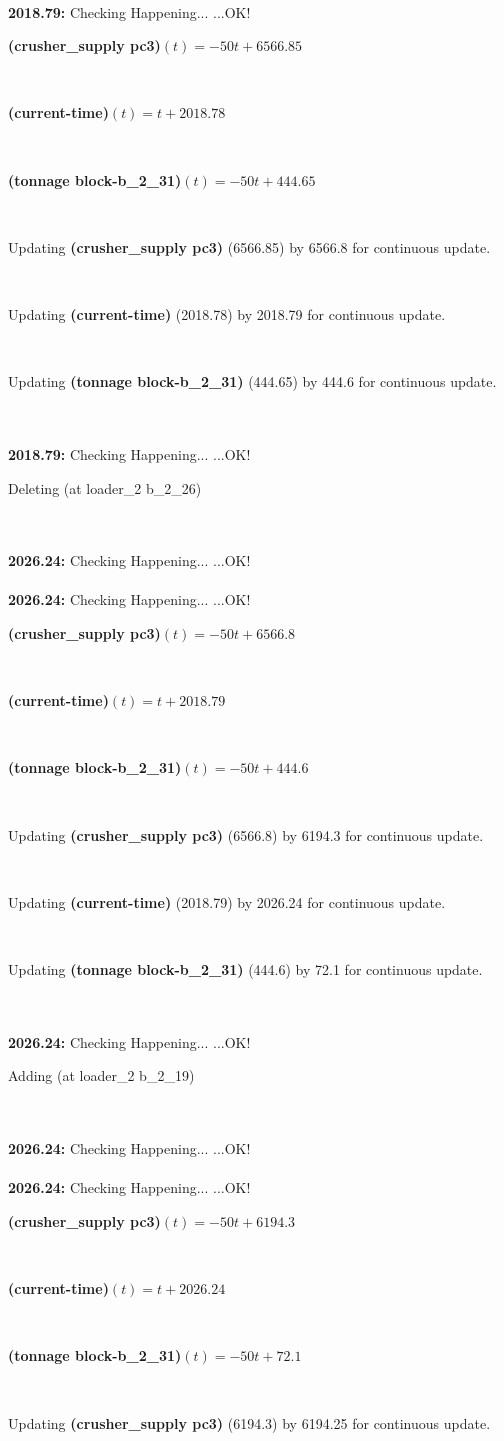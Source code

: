 \documentclass[a4paper,12pt]{article}
\newcommand{\atime}[1]{{\bf #1:}}
\newcommand{\exprn}[1]{{\sf #1}}
\newcommand{\fexprn}[1]{{\small {\bf #1}}}
\newcommand{\checkhappening}{Checking Happening... }
\newcommand{\listrow}[1]{\begin{minipage}[t]{11.5cm} #1 \end{minipage}}
\newcommand{\happeningOK}{...OK!}
\newcommand{\assignmentcts}[3]{\listrow{Updating \fexprn{#1} (#2) by #3 for continuous update.}}
\newcommand{\function}[2]{\listrow{\fexprn{#1}$(t) = #2$}}
\newcommand{\adding}[1]{\listrow{Adding \exprn{#1} }}
\newcommand{\deleting}[1]{\listrow{Deleting \exprn{#1} }}
\begin{document}
\begin{tabbing}
\\
\atime{2018.79} \> \checkhappening\happeningOK\\
 \> \function{(crusher\_supply pc3)}{ - 50t + 6566.85}\\
 \> \function{(current-time)}{t + 2018.78}\\
 \> \function{(tonnage block-b\_2\_31)}{ - 50t + 444.65}\\
 \> \assignmentcts{(crusher\_supply pc3)}{6566.85}{6566.8}\\
 \> \assignmentcts{(current-time)}{2018.78}{2018.79}\\
 \> \assignmentcts{(tonnage block-b\_2\_31)}{444.65}{444.6}\\
\\
\atime{2018.79} \> \checkhappening\happeningOK\\
 \> \deleting{(at loader\_2 b\_2\_26)}\\
\\
\atime{2026.24} \> \checkhappening\happeningOK\\
\\
\atime{2026.24} \> \checkhappening\happeningOK\\
 \> \function{(crusher\_supply pc3)}{ - 50t + 6566.8}\\
 \> \function{(current-time)}{t + 2018.79}\\
 \> \function{(tonnage block-b\_2\_31)}{ - 50t + 444.6}\\
 \> \assignmentcts{(crusher\_supply pc3)}{6566.8}{6194.3}\\
 \> \assignmentcts{(current-time)}{2018.79}{2026.24}\\
 \> \assignmentcts{(tonnage block-b\_2\_31)}{444.6}{72.1}\\
\\
\atime{2026.24} \> \checkhappening\happeningOK\\
 \> \adding{(at loader\_2 b\_2\_19)}\\
\\
\atime{2026.24} \> \checkhappening\happeningOK\\
\\
\atime{2026.24} \> \checkhappening\happeningOK\\
 \> \function{(crusher\_supply pc3)}{ - 50t + 6194.3}\\
 \> \function{(current-time)}{t + 2026.24}\\
 \> \function{(tonnage block-b\_2\_31)}{ - 50t + 72.1}\\
 \> \assignmentcts{(crusher\_supply pc3)}{6194.3}{6194.25}\\

\end{tabbing}
\end{document}

